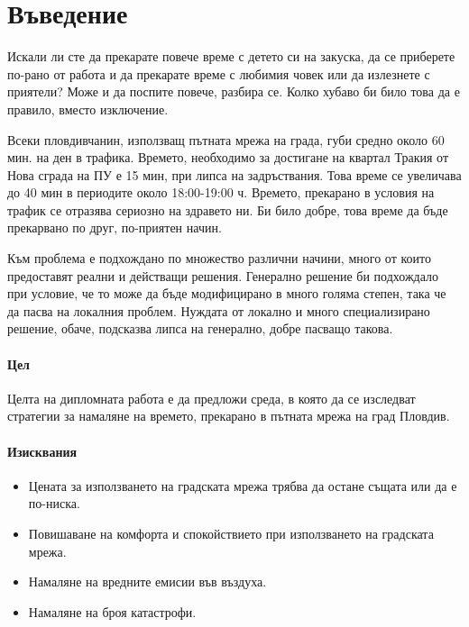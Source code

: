 \chapter*{Въведение}

	Искали ли сте да прекарате повече време с детето си на закуска, 
	да се приберете по-рано от работа и да прекарате време с любимия човек или да излезнете с приятели? 
	Може и да поспите повече, разбира се. Колко хубаво би било това да е правило, вместо изключение.
	
	Всеки пловдивчанин, използващ пътната мрежа на града, губи средно около 60 мин. на ден в трафика.
	Времето, необходимо за достигане на квартал Тракия от Нова сграда на ПУ е 15 мин, при липса на задръствания.
	Това време се увеличава до 40 мин в периодите около 18:00-19:00 ч.
	Времето, прекарано в условия на трафик се отразява сериозно на здравето ни. \cite{HEI}
	Би било добре, това време да бъде прекарвано по друг, по-приятен начин.
	
	Към проблема е подхождано по множество различни начини, много от които предоставят реални и действащи решения.
	Генерално решение би подхождало при условие, че то може да бъде модифицирано в много голяма степен, така че да пасва на локалния проблем.
	Нуждата от локално и много специализирано решение, обаче, подсказва липса на генерално, добре пасващо такова.

	\subsubsection{Цел}

	Целта на дипломната работа е да предложи среда, в която да се изследват стратегии за намаляне на времето, 
	прекарано в пътната мрежа на град Пловдив. 

	\subsubsection{Изисквания}

		\begin{itemize}
			\item Цената за използването на градската мрежа трябва да остане същата или да е по-ниска.
			\item Повишаване на комфорта и спокойствието при използването на градската мрежа.
			\item Намаляне на вредните емисии във въздуха.
			\item Намаляне на броя катастрофи.
		\end{itemize}

